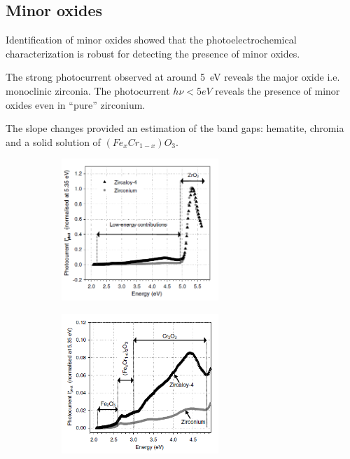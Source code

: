 \documentclass[10pt,compress,handout]{beamer}
\newcommand{\coef}{1}
\begin{document}
\subsection{Minor oxides}
    \begin{frame}{Identification of minor oxides}
        \citet{benaboud2007} showed that the photoelectrochemical characterization 
        is robust for detecting the presence of minor oxides. 
        
        The strong photocurrent observed at around 5~eV 
        reveals the major oxide i.e. monoclinic zirconia. 
        The photocurrent $h\nu < 5 eV$ reveals the presence of minor 
        oxides even in “pure” zirconium. 
        
        The slope changes provided an estimation of the band gaps: 
        hematite, chromia and a solid solution of $(Fe_xCr_{1-x})O_3$. 

        \renewcommand{\coef}{0.45}
        \begin{figure}[h]
            \centering
            \begin{subfigure}{\coef\textwidth}
                \centering
                \includegraphics[width=0.65\textwidth]{./src/figures/Benaboud2007-Fig4.png}
                \caption{}
                \label{fig_benaboud_minor_oxides_a}
            \end{subfigure}
            \begin{subfigure}{\coef\textwidth}
                \centering
                \includegraphics[width=0.65\textwidth]{./src/figures/Benaboud2007-Fig5.png}
                \caption{}
                \label{fig_benaboud_minor_oxides_b}
            \end{subfigure}
            

\end{figure}
\end{frame}
\end{document}

